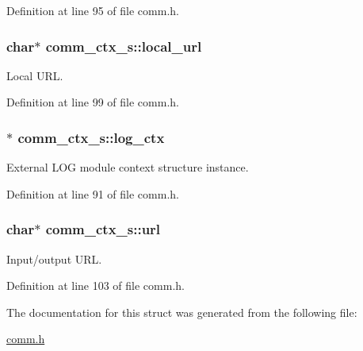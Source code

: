 Definition at line 95 of file comm.\+h.

\subsubsection[{\texorpdfstring{local\+\_\+url}{local_url}}]{\setlength{\rightskip}{0pt plus 5cm}char$\ast$ comm\+\_\+ctx\+\_\+s\+::local\+\_\+url}\hypertarget{structcomm__ctx__s_afa1c9d723a19d1ec55d4ff2e9f8d17e0}{}\label{structcomm__ctx__s_afa1c9d723a19d1ec55d4ff2e9f8d17e0}
Local U\+RL. 

Definition at line 99 of file comm.\+h.

\subsubsection[{\texorpdfstring{log\+\_\+ctx}{log_ctx}}]{$\ast$ comm\+\_\+ctx\+\_\+s\+::log\+\_\+ctx}\hypertarget{structcomm__ctx__s_a8ac71b7c3edcbbf9eb98f8668f9fe572}{}\label{structcomm__ctx__s_a8ac71b7c3edcbbf9eb98f8668f9fe572}
External L\+OG module context structure instance. 

Definition at line 91 of file comm.\+h.

\subsubsection[{\texorpdfstring{url}{url}}]{\setlength{\rightskip}{0pt plus 5cm}char$\ast$ comm\+\_\+ctx\+\_\+s\+::url}\hypertarget{structcomm__ctx__s_aa5fe745b2131be751f5a0e4528c946d3}{}\label{structcomm__ctx__s_aa5fe745b2131be751f5a0e4528c946d3}
Input/output U\+RL. 

Definition at line 103 of file comm.\+h.



The documentation for this struct was generated from the following file\+:\begin{DoxyCompactItemize}
\item 
\hyperlink{comm_8h}{comm.\+h}\end{DoxyCompactItemize}
